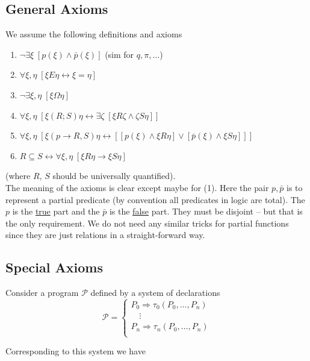 \documentclass{article}
\newcommand{\scP}{\mathscr{P}}
\begin{document}
\subsection{General Axioms}
We assume the following definitions and axioms

\begin{enumerate}[label=(\arabic*)]
    \item $\neg \exists \xi \; [p(\xi) \wedge \bar{p}(\xi)]$ (sim for $q, \pi, \ldots$)
    \item $\forall \xi, \eta \; [\xi E \eta \leftrightarrow \xi = \eta]$
    \item $\neg \exists \xi, \eta \; [\xi \Omega \eta]$
    \item $\forall \xi, \eta \; [ \xi (R; S) \eta \leftrightarrow \exists \zeta \; [\xi R \zeta \wedge \zeta S \eta]]$
    \item $\forall \xi, \eta \; [ \xi (p \to R, S) \eta \leftrightarrow [ [p(\xi) \wedge \xi R \eta] \vee [\bar{p}(\xi) \wedge \xi S \eta] ]]$
    \item $R \subseteq S \leftrightarrow \forall \xi, \eta \;[\xi R \eta \to \xi S \eta]$
\end{enumerate}
(where $R$, $S$ should be universally quantified). \\

The meaning of the axioms is clear except maybe for (1). Here the pair $p, \bar{p}$ is to represent a partial predicate (by convention all predicates in logic are total). The $p$ is the \underline{true} part and the $\bar{p}$ is the \underline{false} part. They must be disjoint -- but that is the only requirement. We do not need any similar tricks for partial functions since they are just relations in a straight-forward way. 

\subsection{Special Axioms}
Consider a program $\scP$ defined by a system of declarations
\begin{equation*}
    \scP = \begin{cases}
        P_0 \Rightarrow \tau_0(P_0, \ldots, P_n) \\
        \quad \vdots \\
        P_n \Rightarrow \tau_n(P_0, \ldots, P_n) \\
    \end{cases}
\end{equation*}

Corresponding to this system we have
\end{document}
